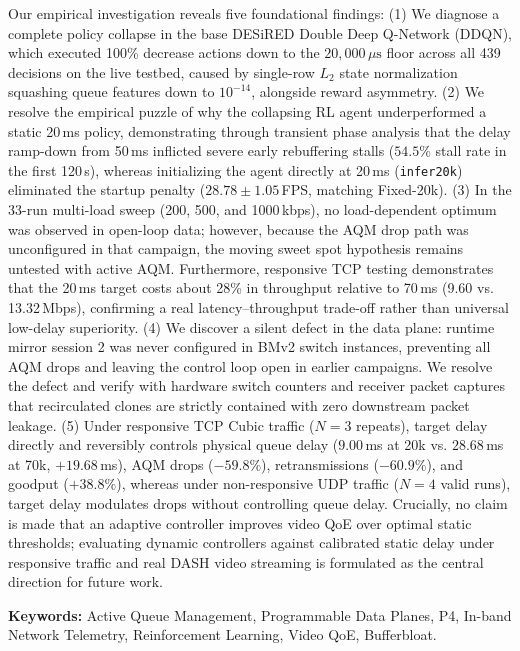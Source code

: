 \documentclass[12pt,a4paper,oneside]{report}
\begin{document}
Our empirical investigation reveals five foundational findings: (1) We diagnose a complete policy collapse in the base DESiRED Double Deep Q-Network (DDQN), which executed 100\% decrease actions down to the $20,000\,\mu\text{s}$ floor across all 439 decisions on the live testbed, caused by single-row $L_2$ state normalization squashing queue features down to $10^{-14}$, alongside reward asymmetry. (2) We resolve the empirical puzzle of why the collapsing RL agent underperformed a static 20\,ms policy, demonstrating through transient phase analysis that the delay ramp-down from 50\,ms inflicted severe early rebuffering stalls ($54.5\%$ stall rate in the first 120\,s), whereas initializing the agent directly at 20\,ms (\texttt{infer20k}) eliminated the startup penalty ($28.78 \pm 1.05$\,FPS, matching Fixed-20k). (3) In the 33-run multi-load sweep (200, 500, and 1000\,kbps), no load-dependent optimum was observed in open-loop data; however, because the AQM drop path was unconfigured in that campaign, the moving sweet spot hypothesis remains untested with active AQM. Furthermore, responsive TCP testing demonstrates that the 20\,ms target costs about 28\% in throughput relative to 70\,ms (9.60 vs. 13.32\,Mbps), confirming a real latency--throughput trade-off rather than universal low-delay superiority. (4) We discover a silent defect in the data plane: runtime mirror session 2 was never configured in BMv2 switch instances, preventing all AQM drops and leaving the control loop open in earlier campaigns. We resolve the defect and verify with hardware switch counters and receiver packet captures that recirculated clones are strictly contained with zero downstream packet leakage. (5) Under responsive TCP Cubic traffic ($N=3$ repeats), target delay directly and reversibly controls physical queue delay ($9.00$\,ms at 20k vs. $28.68$\,ms at 70k, $+19.68$\,ms), AQM drops ($-59.8\%$), retransmissions ($-60.9\%$), and goodput ($+38.8\%$), whereas under non-responsive UDP traffic ($N=4$ valid runs), target delay modulates drops without controlling queue delay. Crucially, no claim is made that an adaptive controller improves video QoE over optimal static thresholds; evaluating dynamic controllers against calibrated static delay under responsive traffic and real DASH video streaming is formulated as the central direction for future work.

\vspace{0.5cm}
\noindent\textbf{Keywords:} Active Queue Management, Programmable Data Planes, P4, In-band Network Telemetry, Reinforcement Learning, Video QoE, Bufferbloat.
\end{document}
